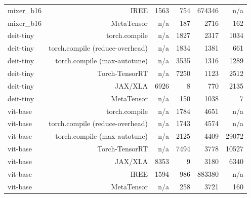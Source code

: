 \begin{tabular}{lrrrrr}
mixer\_b16 & IREE & 1563 & 754 & 674346 & n/a \\
mixer\_b16 & MetaTensor & n/a & 187 & 2716 & 162 \\
deit-tiny & torch.compile & n/a & 1827 & 2317 & 1034 \\
deit-tiny & torch.compile (reduce-overhead) & n/a & 1834 & 1381 & 661 \\
deit-tiny & torch.compile (max-autotune) & n/a & 3535 & 1316 & 1289 \\
deit-tiny & Torch-TensorRT & n/a & 7250 & 1123 & 2512 \\
deit-tiny & JAX/XLA & 6926 & 8 & 770 & 2135 \\
deit-tiny & MetaTensor & n/a & 150 & 1038 & 7 \\
vit-base & torch.compile & n/a & 1784 & 4651 & n/a \\
vit-base & torch.compile (reduce-overhead) & n/a & 1743 & 4574 & n/a \\
vit-base & torch.compile (max-autotune) & n/a & 2125 & 4409 & 29072 \\
vit-base & Torch-TensorRT & n/a & 7494 & 3778 & 10527 \\
vit-base & JAX/XLA & 8353 & 9 & 3180 & 6340 \\
vit-base & IREE & 1594 & 986 & 883380 & n/a \\
vit-base & MetaTensor & n/a & 258 & 3721 & 160 \\
\bottomrule
\end{tabular}
